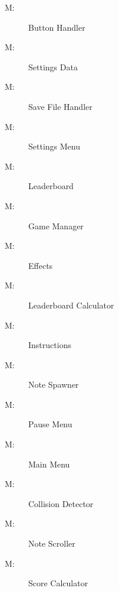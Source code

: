 \documentclass[12pt, titlepage]{article}
\newcounter{mnum}
\newcommand{\mthemnum}{M\themnum}
\begin{document}
\begin{description}
\item [ \mthemnum \label{m1}:] Button Handler
\item [ \mthemnum \label{m2}:] Settings Data
\item [ \mthemnum \label{m3}:] Save File Handler
\item [ \mthemnum \label{m4}:] Settings Menu
\item [ \mthemnum \label{m5}:] Leaderboard

\item [ \mthemnum \label{m6}:] Game Manager
\item [ \mthemnum \label{m7}:] Effects
\item [ \mthemnum \label{m8}:] Leaderboard Calculator
\item [ \mthemnum \label{m9}:] Instructions
\item [ \mthemnum \label{m10}:] Note Spawner

\item [ \mthemnum \label{m11}:] Pause Menu
\item [ \mthemnum \label{m12}:] Main Menu
\item [ \mthemnum \label{m13}:] Collision Detector
\item [ \mthemnum \label{m14}:] Note Scroller
\item [ \mthemnum \label{m15}:] Score Calculator
\end{description}
\end{document}
